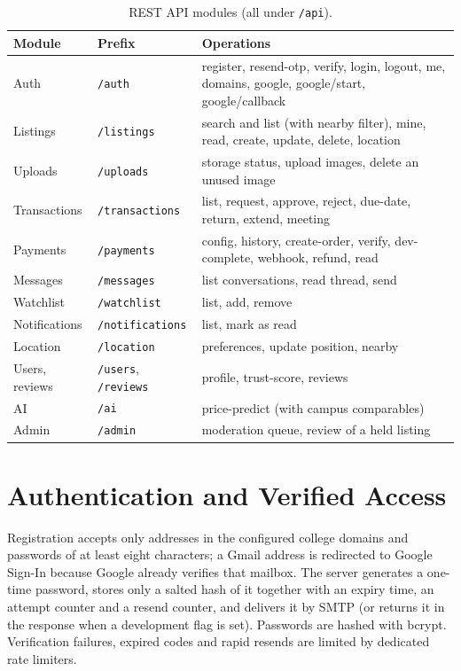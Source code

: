 \documentclass[11pt,letterpaper,oneside]{report}
\newcommand{\code}[1]{\texttt{#1}}
\begin{document}
\begin{table}[h]
\centering
\caption{REST API modules (all under \code{/api}).}\label{tab:api}
\small
\begin{tabularx}{\textwidth}{@{}L{2.2cm}L{2.7cm}X@{}}
\toprule
\textbf{Module} & \textbf{Prefix} & \textbf{Operations}\\
\midrule
Auth & \code{/auth} & register, resend-otp, verify, login, logout, me, domains, google, google/start, google/callback\\
Listings & \code{/listings} & search and list (with nearby filter), mine, read, create, update, delete, location\\
Uploads & \code{/uploads} & storage status, upload images, delete an unused image\\
Transactions & \code{/transactions} & list, request, approve, reject, due-date, return, extend, meeting\\
Payments & \code{/payments} & config, history, create-order, verify, dev-complete, webhook, refund, read\\
Messages & \code{/messages} & list conversations, read thread, send\\
Watchlist & \code{/watchlist} & list, add, remove\\
Notifications & \code{/notifications} & list, mark as read\\
Location & \code{/location} & preferences, update position, nearby\\
Users, reviews & \code{/users}, \code{/reviews} & profile, trust-score, reviews\\
AI & \code{/ai} & price-predict (with campus comparables)\\
Admin & \code{/admin} & moderation queue, review of a held listing\\
\bottomrule
\end{tabularx}
\end{table}

\section{Authentication and Verified Access}
Registration accepts only addresses in the configured college domains and passwords of at least eight
characters; a Gmail address is redirected to Google Sign-In because Google already verifies that mailbox.
The server generates a one-time password, stores only a salted hash of it together with an expiry time,
an attempt counter and a resend counter, and delivers it by SMTP (or returns it in the response when a
development flag is set). Passwords are hashed with bcrypt. Verification failures, expired codes and rapid
resends are limited by dedicated rate limiters.
\end{document}
